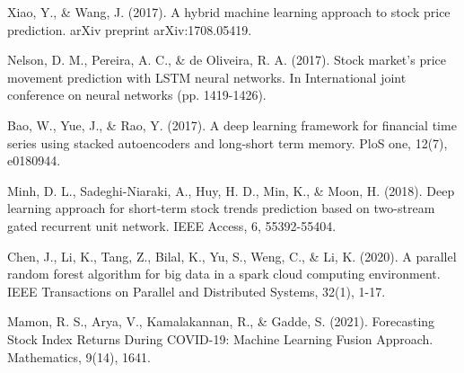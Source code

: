 \documentclass{ieeeojies}
\begin{document}
\begin{thebibliography}{00}
 Xiao, Y., \& Wang, J. (2017). A hybrid machine learning approach to stock price prediction. arXiv preprint arXiv:1708.05419.

 Nelson, D. M., Pereira, A. C., \& de Oliveira, R. A. (2017). Stock market's price movement prediction with LSTM neural networks. In International joint conference on neural networks (pp. 1419-1426).

 Bao, W., Yue, J., \& Rao, Y. (2017). A deep learning framework for financial time series using stacked autoencoders and long-short term memory. PloS one, 12(7), e0180944.

 Minh, D. L., Sadeghi-Niaraki, A., Huy, H. D., Min, K., \& Moon, H. (2018). Deep learning approach for short-term stock trends prediction based on two-stream gated recurrent unit network. IEEE Access, 6, 55392-55404.

 Chen, J., Li, K., Tang, Z., Bilal, K., Yu, S., Weng, C., \& Li, K. (2020). A parallel random forest algorithm for big data in a spark cloud computing environment. IEEE Transactions on Parallel and Distributed Systems, 32(1), 1-17.

 Mamon, R. S., Arya, V., Kamalakannan, R., \& Gadde, S. (2021). Forecasting Stock Index Returns During COVID-19: Machine Learning Fusion Approach. Mathematics, 9(14), 1641.

\end{thebibliography}


\EOD
\end{document}
